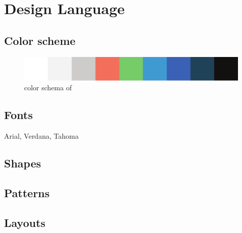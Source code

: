 \section{Design Language}

\subsection{Color scheme}

\begin{figure}[htb]
    \centering
    \includegraphics[width=\textwidth]{gfx/color_schema.pdf}
    \caption{color schema of \projectname{}}
    \label{fig:color_schema}
\end{figure}




\subsection{Fonts}

Arial, Verdana, Tahoma


\subsection{Shapes}




\subsection{Patterns}


\subsection{Layouts}
